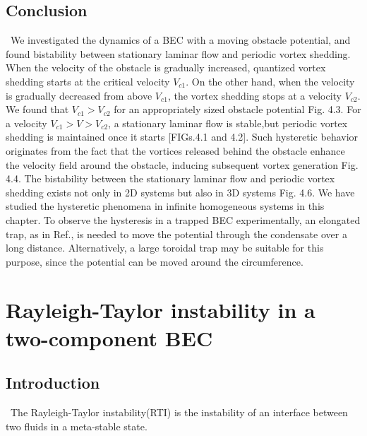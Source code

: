 \documentclass[12pt,a4paper]{report} %
\begin{document}
\section{Conclusion}
\ We investigated the dynamics of a BEC with a moving
obstacle potential, and found bistability between stationary
laminar flow and periodic vortex shedding. When the velocity
of the obstacle is gradually increased, quantized vortex
shedding starts at the critical velocity $V_{c1}$. On the other hand,
when the velocity is gradually decreased from above $V_{c1}$,
the vortex shedding stops at a velocity $V_{c2}$. We found that
$V_{c1} > V_{c2}$ for an appropriately sized obstacle potential Fig. 4.3.
For a velocity $V_{c1} > V > V_{c2}$, a stationary laminar flow is
stable,but periodic vortex shedding is maintained once it starts
[FIGs.4.1 and 4.2]. Such hysteretic behavior originates from the
fact that the vortices released behind the obstacle enhance the
velocity field around the obstacle, inducing subsequent vortex
generation Fig. 4.4. The bistability between the stationary
laminar flow and periodic vortex shedding exists not only in
2D systems but also in 3D systems Fig. 4.6.
We have studied the hysteretic phenomena in infinite
homogeneous systems in this chapter. To observe the hysteresis
in a trapped BEC experimentally, an elongated trap, as
in Ref.\cite{57}, is needed to move the potential through the
condensate over a long distance.
Alternatively, a large toroidal trap may be suitable for
this purpose, since the potential can be moved around the 
circumference.

\chapter{Rayleigh-Taylor instability in a two-component BEC}
\section{Introduction}
\ The Rayleigh-Taylor instability(RTI) \cite{58}\cite{59}\cite{60}\cite{61} is the instability of an interface between
two fluids in a meta-stable state.
\end{document}
